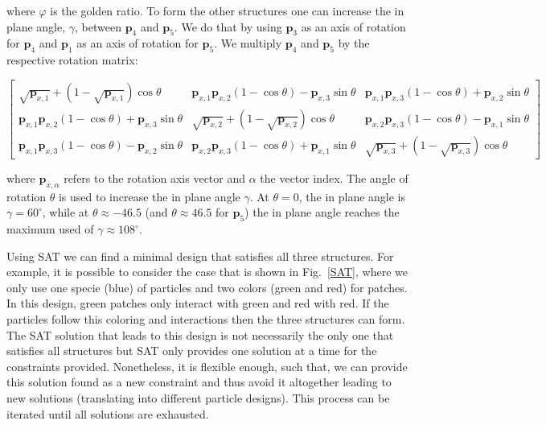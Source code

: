 \documentclass[a4paper, amsfonts, amssymb, amsmath, reprint, showkeys, nofootinbib, oneside]{revtex4-1}
\begin{document}
\noindent where $\varphi$ is the golden ratio. To form the other structures one can increase the in plane angle, $\gamma$, between $\textbf{p}_4$ and $\textbf{p}_5$. We do that by using $\textbf{p}_3$ as an axis of rotation for $\textbf{p}_4$ and $\textbf{p}_1$ as an axis of rotation for $\textbf{p}_5$. We multiply $\textbf{p}_4$ and $\textbf{p}_5$ by the respective rotation matrix:

\begin{widetext}
\begin{equation}
	\begin{bmatrix}
		\sqrt{\textbf{p}_{x,1}}+(1-\sqrt{\textbf{p}_{x,1}})\cos\theta & \textbf{p}_{x,1}\textbf{p}_{x,2}(1-\cos\theta)-\textbf{p}_{x,3}\sin\theta & \textbf{p}_{x,1}\textbf{p}_{x,3}(1-\cos\theta)+\textbf{p}_{x,2}\sin\theta \\
		\textbf{p}_{x,1}\textbf{p}_{x,2}(1-\cos\theta)+\textbf{p}_{x,3}\sin\theta & \sqrt{\textbf{p}_{x,2}}+(1-\sqrt{\textbf{p}_{x,2}})\cos\theta & \textbf{p}_{x,2}\textbf{p}_{x,3}(1-\cos\theta)-\textbf{p}_{x,1}\sin\theta \\
		\textbf{p}_{x,1}\textbf{p}_{x,3}(1-\cos\theta)-\textbf{p}_{x,2}\sin\theta & \textbf{p}_{x,2}\textbf{p}_{x,3}(1-\cos\theta)+\textbf{p}_{x,1}\sin\theta & \sqrt{\textbf{p}_{x,3}}+(1-\sqrt{\textbf{p}_{x,3}})\cos\theta
	\end{bmatrix}
\end{equation}
\end{widetext}

\noindent where $\textbf{p}_{x,\alpha}$ refers to the rotation axis vector and $\alpha$ the vector index. The angle of rotation $\theta$ is used to increase the in plane angle $\gamma$. At $\theta=0$, the in plane angle is $\gamma=60^\circ$, while at $\theta\approx-46.5$ (and $\theta\approx46.5$ for $\textbf{p}_{5}$) the in plane angle reaches the maximum used of $\gamma\approx108^\circ$.


Using SAT we can find a minimal design that satisfies all three structures. For example, it is possible to consider the case that is shown in Fig.~\ref{SAT}, where we only use one specie (blue) of particles and two colors (green and red) for patches. In this design, green patches only interact with green and red with red. If the particles follow this coloring and interactions then the three structures can form. The SAT solution that leads to this design is not necessarily the only one that satisfies all structures but SAT only provides one solution at a time for the constraints provided. Nonetheless, it is flexible enough, such that, we can provide this solution found as a new constraint and thus avoid it altogether leading to new solutions (translating into different particle designs). This process can be iterated until all solutions are exhausted. 
\end{document}
